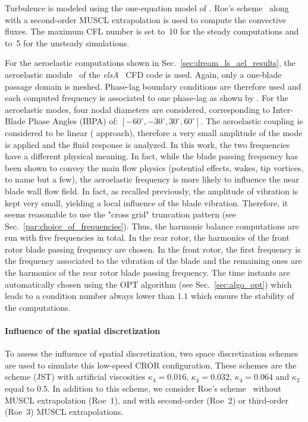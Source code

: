 Turbulence is modeled using the one-equation model of
\citet{Spalart1992}.  Roe's scheme~\cite{Roe1981} along with a 
second-order MUSCL extrapolation 
is used to compute the convective fluxes.
The maximum CFL number is set to~10 for the steady 
computations and to~5 for the unsteady simulations.

For the aeroelastic computations shown in
Sec.~\ref{sec:dream_ls_ael_results}, 
the aeroelastic module~\cite{CIDugeai2011} 
of the \textit{elsA}~\cite{Cambier2013} CFD code is used.
Again, only a one-blade passage domain is meshed.
Phase-lag boundary conditions are therefore used
and each computed frequency is associated to one phase-lag
as shown by \citet{ThesisGuedeney}.
For the aeroelastic modes, 
four nodal diameters are considered, corresponding to Inter-Blade
Phase Angles (IBPA) of: $[-60^\circ, -30^\circ, 30^\circ, 60^\circ]$. 
The aeroelastic coupling is considered to be linear (
approach), therefore a very small amplitude of the mode is applied
and the fluid response is analyzed.
In this work, the two frequencies 
have a different physical meaning. In fact, while the blade passing frequency
has been shown to convey the main flow physics (potential effects, wakes, 
tip vortices, to name but a few), the aeroelastic frequency is more likely
to influence the near blade wall flow field. In fact, as recalled
previously, the amplitude of vibration is kept very small,
yielding a local influence of the blade vibration.
Therefore, it seems reasonable to use the "cross grid"
truncation pattern (see Sec.~\ref{par:choice_of_frequencies}).
Thus, the harmonic balance computations are run with
five frequencies in total. In the rear rotor,
the harmonics of the front rotor blade passing frequency
are chosen. In the front rotor, the first frequency is the
frequency associated to the vibration of the blade and the
remaining ones are the harmonics of the rear rotor blade 
passing frequency.
The time instants are automatically chosen using the OPT
algorithm (see Sec.~\ref{sec:algo_opt}) which leads to 
a condition number always lower than $1.1$ which ensure
the stability of the computations.

\paragraph{Influence of the spatial discretization}
\label{sub:dream_ls_spatial_discretization}

To assess the influence of spatial discretization, two 
space discretization schemes are used to simulate this low-speed CROR configuration.
These schemes are the \citet{Jameson1981} scheme (JST) with artificial
viscosities $\kappa_4 = 0.016$, $\kappa_4 = 0.032$, $\kappa_4 = 0.064$
and $\kappa_2$ equal to $0.5$. In addition to this scheme, we consider
Roe's scheme~\cite{Roe1981} without MUSCL extrapolation (Roe~1),
and with second-order (Roe~2) or third-order (Roe~3) 
MUSCL extrapolations.

